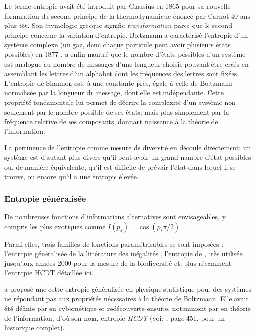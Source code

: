 \documentclass[fleqn,10pt]{ArtEcoFoG} %
\begin{document}
Le terme \og entropie\fg{} avait été introduit par Clausius en 1865 pour
sa nouvelle formulation du second principe de la thermodynamique énoncé
par Carnot 40 ans plus tôt. Son étymologie grecque signifie
\emph{transformation} parce que le second principe concerne la variation
d'entropie. Boltzmann a caractérisé l'entropie d'un système complexe (un
gaz, donc chaque particule peut avoir plusieurs états possibles) en 1877
\citep{Sharp2015}. \citet{Shannon1948} a enfin montré que le nombre
d'états possibles d'un système est analogue au nombre de messages d'une
longueur choisie pouvant être créés en assemblant les lettres d'un
alphabet dont les fréquences des lettres sont fixées. L'entropie de
Shannon est, à une constante près, égale à celle de Boltzmann normalisée
par la longueur du message, dont elle est indépendante. Cette propriété
fondamentale lui permet de décrire la complexité d'un système non
seulement par le nombre possible de ses états, mais plus simplement par
la fréquence relative de ses composants, donnant naissance à la théorie
de l'information.

La pertinence de l'entropie comme mesure de diversité en découle
directement: un système est d'autant plus divers qu'il peut avoir un
grand nombre d'état possibles ou, de manière équivalente, qu'il est
difficile de prévoir l'état dans lequel il se trouve, ou encore qu'il a
une entropie élevée.

\subsubsection{Entropie généralisée}\label{entropie-generalisee}

De nombreuses fonctions d'informations alternatives sont envisageables,
y compris les plus exotiques comme \(I(p_s)=\cos({p_s \pi/2})\)
\citep{Gregorius2014}.

Parmi elles, trois familles de fonctions paramétrisables se sont
imposées : l'entropie généralisée de la littérature des inégalités
\citep{Shorrocks1980}, l'entropie de \citet{Renyi1961}, très utilisée
jusqu'aux années 2000 pour la mesure de la biodiversité et, plus
récemment, l'entropie HCDT détaillée ici.

\citet{Tsallis1988} a proposé une cette entropie généralisée en physique
statistique pour des systèmes ne répondant pas aux propriétés
nécessaires à la théorie de Boltzmann. Elle avait été définie par
\citet{Havrda1967} en cybernétique et redécouverte ensuite, notamment
par \citet{Daroczy1970} en théorie de l'information, d'où son nom,
entropie \emph{HCDT} (voir \citet{Mendes2008}, page 451, pour un
historique complet).
\end{document}
